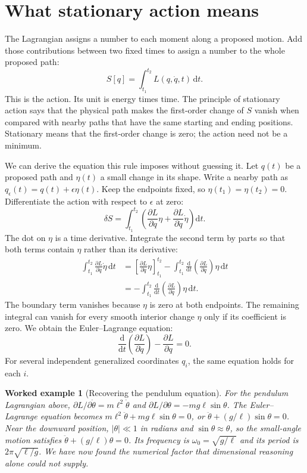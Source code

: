 \documentclass[11pt,oneside]{book}
\newcommand{\dd}{\mathrm{d}}
\newcommand{\pd}[2]{\frac{\partial #1}{\partial #2}}
\newcommand{\od}[2]{\frac{\dd #1}{\dd #2}}
\theoremstyle{reviewstyle}
\newtheorem{example}{Worked example}[chapter]
\begin{document}
\section{What stationary action means}
The Lagrangian assigns a number to each moment along a proposed motion. Add those contributions between two fixed times to assign a number to the whole proposed path:
\begin{equation}
S[q]=\int_{t_1}^{t_2}L(q,\dot q,t)\,\dd t.
\end{equation}
This is the action. Its unit is energy times time. The principle of stationary action says that the physical path makes the first-order change of $S$ vanish when compared with nearby paths that have the same starting and ending positions. Stationary means that the first-order change is zero; the action need not be a minimum.

We can derive the equation this rule imposes without guessing it. Let $q(t)$ be a proposed path and $\eta(t)$ a small change in its shape. Write a nearby path as $q_\epsilon(t)=q(t)+\epsilon\eta(t)$. Keep the endpoints fixed, so $\eta(t_1)=\eta(t_2)=0$. Differentiate the action with respect to $\epsilon$ at zero:
\begin{equation}
\delta S=\int_{t_1}^{t_2}
\left(\pd Lq\eta+\pd L{\dot q}\dot\eta\right)\dd t.
\end{equation}
The dot on $\eta$ is a time derivative. Integrate the second term by parts so that both terms contain $\eta$ rather than its derivative:
\begin{align}
\int_{t_1}^{t_2}\pd L{\dot q}\dot\eta\,\dd t
&=\left[\pd L{\dot q}\eta\right]_{t_1}^{t_2}
-\int_{t_1}^{t_2}\od{}{t}\left(\pd L{\dot q}\right)\eta\,\dd t\\
&=-\int_{t_1}^{t_2}\od{}{t}\left(\pd L{\dot q}\right)\eta\,\dd t.
\end{align}
The boundary term vanishes because $\eta$ is zero at both endpoints. The remaining integral can vanish for every smooth interior change $\eta$ only if its coefficient is zero. We obtain the Euler--Lagrange equation:
\begin{equation}
\boxed{\od{}{t}\left(\pd L{\dot q}\right)-\pd Lq=0.}
\end{equation}
For several independent generalized coordinates $q_i$, the same equation holds for each $i$.

\begin{example}[Recovering the pendulum equation]
For the pendulum Lagrangian above, $\partial L/\partial\dot\theta=m\ell^2\dot\theta$ and $\partial L/\partial\theta=-mg\ell\sin\theta$. The Euler--Lagrange equation becomes $m\ell^2\ddot\theta+mg\ell\sin\theta=0$, or $\ddot\theta+(g/\ell)\sin\theta=0$. Near the downward position, $|\theta|\ll1$ in radians and $\sin\theta\approx\theta$, so the small-angle motion satisfies $\ddot\theta+(g/\ell)\theta=0$. Its frequency is $\omega_0=\sqrt{g/\ell}$ and its period is $2\pi\sqrt{\ell/g}$. We have now found the numerical factor that dimensional reasoning alone could not supply.
\end{example}
\end{document}
